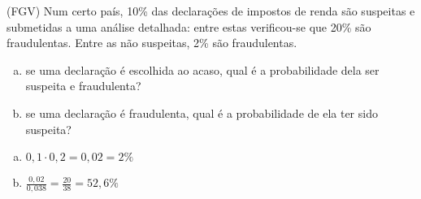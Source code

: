 \begin{ex}
(FGV) Num certo país, 10\% das declarações de impostos de renda são suspeitas e submetidas a uma análise detalhada: entre estas verificou-se que 20\% são fraudulentas. Entre as não suspeitas, 2\% são fraudulentas.
   \begin{enumerate}[(a)]
   \item se uma declaração é escolhida ao acaso, qual é a probabilidade dela ser suspeita e fraudulenta?
   \item se uma declaração é fraudulenta, qual é a probabilidade de ela ter sido suspeita?
   \end{enumerate}
     \begin{sol}
       \phantom{A}
        \begin{enumerate} [(a)]
            \item $0,1\cdot0,2=0,02=2\%$
            \item $\frac{0,02}{0,038}=\frac{20}{38}=52,6\%$
            
        \end{enumerate}
     \end{sol}
\end{ex}